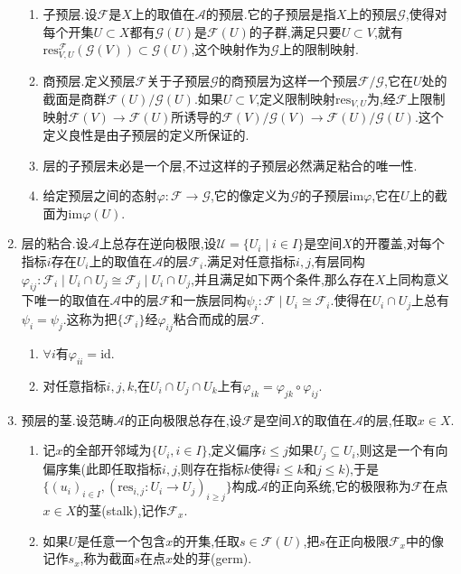 \begin{enumerate}
\begin{enumerate}
		\item 子预层.设$\mathscr{F}$是$X$上的取值在$\mathscr{A}$的预层.它的子预层是指$X$上的预层$\mathscr{G}$,使得对每个开集$U\subset X$都有$\mathscr{G}(U)$是$\mathscr{F}(U)$的子群,满足只要$U\subset V$,就有$\mathrm{res}^\mathscr{F}_{V,U}(\mathscr{G}(V))\subset\mathscr{G}(U)$,这个映射作为$\mathscr{G}$上的限制映射.
		\item 商预层.定义预层$\mathscr{F}$关于子预层$\mathscr{G}$的商预层为这样一个预层$\mathscr{F}/\mathscr{G}$,它在$U$处的截面是商群$\mathscr{F}(U)/\mathscr{G}(U)$.如果$U\subset V$,定义限制映射$\mathrm{res}_{V,U}$为,经$\mathscr{F}$上限制映射$\mathscr{F}(V)\to \mathscr{F}(U)$所诱导的$\mathscr{F}(V)/\mathscr{G}(V)\to \mathscr{F}(U)/\mathscr{G}(U)$.这个定义良性是由子预层的定义所保证的.
		\item 层的子预层未必是一个层,不过这样的子预层必然满足粘合的唯一性.
		\item 给定预层之间的态射$\varphi:\mathscr{F}\to\mathscr{G}$,它的像定义为$\mathscr{G}$的子预层$\mathrm{im}\varphi$,它在$U$上的截面为$\mathrm{im}\varphi(U)$.
	\end{enumerate}
	\item 层的粘合.设$\mathscr{A}$上总存在逆向极限,设$\mathscr{U}=\{U_i\mid i\in I\}$是空间$X$的开覆盖,对每个指标$i$存在$U_i$上的取值在$\mathscr{A}$的层$\mathscr{F}_i$.满足对任意指标$i,j$,有层同构$\varphi_{ij}:\mathscr{F}_i\mid U_i\cap U_j\cong\mathscr{F}_j\mid U_i\cap U_j$,并且满足如下两个条件,那么存在$X$上同构意义下唯一的取值在$\mathscr{A}$中的层$\mathscr{F}$和一族层同构$\psi_i:\mathscr{F}\mid U_i\cong\mathscr{F}_i$.使得在$U_i\cap U_j$上总有$\psi_i=\psi_j$.这称为把$\{\mathscr{F}_i\}$经$\varphi_{ij}$粘合而成的层$\mathscr{F}$.
	\begin{enumerate}[(1)]
		\item $\forall i$有$\varphi_{ii}=\mathrm{id}$.
		\item 对任意指标$i,j,k$,在$U_i\cap U_j\cap U_k$上有$\varphi_{ik}=\varphi_{jk}\circ\varphi_{ij}$.
	\end{enumerate}
	\item 预层的茎.设范畴$\mathscr{A}$的正向极限总存在,设$\mathscr{F}$是空间$X$的取值在$\mathscr{A}$的层,任取$x\in X$.
	\begin{enumerate}[(1)]
		\item 记$x$的全部开邻域为$\{U_i,i\in I\}$,定义偏序$i\le j$如果$U_j\subseteq U_i$,则这是一个有向偏序集(此即任取指标$i,j$,则存在指标$k$使得$i\le k$和$j\le k$),于是$\{(u_i)_{i\in I},(\mathrm{res}_{i,j}:U_i\to U_j)_{i\ge j}\}$构成$\mathscr{A}$的正向系统,它的极限称为$\mathscr{F}$在点$x\in X$的茎(stalk),记作$\mathscr{F}_x$.
		\item 如果$U$是任意一个包含$x$的开集,任取$s\in\mathscr{F}(U)$,把$s$在正向极限$\mathscr{F}_x$中的像记作$s_x$,称为截面$s$在点$x$处的芽(germ).
	\end{enumerate}
\end{enumerate}
